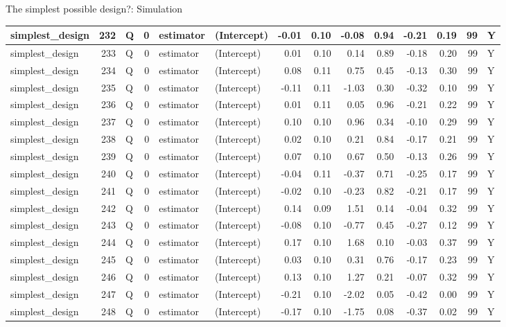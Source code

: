 \documentclass[
  11pt,
  ignorenonframetext,
]{beamer}
\begin{document}
\begin{frame}[fragile]{The simplest possible design?: Simulation}
\begin{tabular}{l|r|l|r|l|l|r|r|r|r|r|r|r|l}
\hline
simplest\_design & 232 & Q & 0 & estimator & (Intercept) & -0.01 & 0.10 & -0.08 & 0.94 & -0.21 & 0.19 & 99 & Y\\
\hline
simplest\_design & 233 & Q & 0 & estimator & (Intercept) & 0.01 & 0.10 & 0.14 & 0.89 & -0.18 & 0.20 & 99 & Y\\
\hline
simplest\_design & 234 & Q & 0 & estimator & (Intercept) & 0.08 & 0.11 & 0.75 & 0.45 & -0.13 & 0.30 & 99 & Y\\
\hline
simplest\_design & 235 & Q & 0 & estimator & (Intercept) & -0.11 & 0.11 & -1.03 & 0.30 & -0.32 & 0.10 & 99 & Y\\
\hline
simplest\_design & 236 & Q & 0 & estimator & (Intercept) & 0.01 & 0.11 & 0.05 & 0.96 & -0.21 & 0.22 & 99 & Y\\
\hline
simplest\_design & 237 & Q & 0 & estimator & (Intercept) & 0.10 & 0.10 & 0.96 & 0.34 & -0.10 & 0.29 & 99 & Y\\
\hline
simplest\_design & 238 & Q & 0 & estimator & (Intercept) & 0.02 & 0.10 & 0.21 & 0.84 & -0.17 & 0.21 & 99 & Y\\
\hline
simplest\_design & 239 & Q & 0 & estimator & (Intercept) & 0.07 & 0.10 & 0.67 & 0.50 & -0.13 & 0.26 & 99 & Y\\
\hline
simplest\_design & 240 & Q & 0 & estimator & (Intercept) & -0.04 & 0.11 & -0.37 & 0.71 & -0.25 & 0.17 & 99 & Y\\
\hline
simplest\_design & 241 & Q & 0 & estimator & (Intercept) & -0.02 & 0.10 & -0.23 & 0.82 & -0.21 & 0.17 & 99 & Y\\
\hline
simplest\_design & 242 & Q & 0 & estimator & (Intercept) & 0.14 & 0.09 & 1.51 & 0.14 & -0.04 & 0.32 & 99 & Y\\
\hline
simplest\_design & 243 & Q & 0 & estimator & (Intercept) & -0.08 & 0.10 & -0.77 & 0.45 & -0.27 & 0.12 & 99 & Y\\
\hline
simplest\_design & 244 & Q & 0 & estimator & (Intercept) & 0.17 & 0.10 & 1.68 & 0.10 & -0.03 & 0.37 & 99 & Y\\
\hline
simplest\_design & 245 & Q & 0 & estimator & (Intercept) & 0.03 & 0.10 & 0.31 & 0.76 & -0.17 & 0.23 & 99 & Y\\
\hline
simplest\_design & 246 & Q & 0 & estimator & (Intercept) & 0.13 & 0.10 & 1.27 & 0.21 & -0.07 & 0.32 & 99 & Y\\
\hline
simplest\_design & 247 & Q & 0 & estimator & (Intercept) & -0.21 & 0.10 & -2.02 & 0.05 & -0.42 & 0.00 & 99 & Y\\
\hline
simplest\_design & 248 & Q & 0 & estimator & (Intercept) & -0.17 & 0.10 & -1.75 & 0.08 & -0.37 & 0.02 & 99 & Y\\

\end{tabular}
\end{frame}
\end{document}
